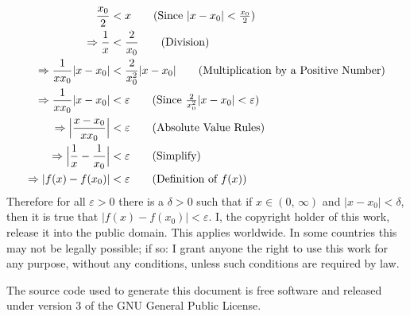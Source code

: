\documentclass{article}
\theoremstyle{normal}
\begin{document}
    \begin{align}
        \frac{x_{0}}{2}&<x
            \tag{Since $|x-x_{0}|<\frac{x_{0}}{2}$}\\
        \Rightarrow
            \frac{1}{x}&<\frac{2}{x_{0}}
                \tag{Division}\\
        \Rightarrow
            \frac{1}{xx_{0}}|x-x_{0}|&<\frac{2}{x_{0}^{2}}|x-x_{0}|
                \tag{Multiplication by a Positive Number}\\
        \Rightarrow
            \frac{1}{xx_{0}}|x-x_{0}|&<\varepsilon
                \tag{Since $\frac{2}{x_{0}^{2}}|x-x_{0}|<\varepsilon$}\\
        \Rightarrow
            \Big|\frac{x-x_{0}}{xx_{0}}\Big|&<\varepsilon
                \tag{Absolute Value Rules}\\
        \Rightarrow
            \Big|\frac{1}{x}-\frac{1}{x_{0}}\Big|&<\varepsilon
                \tag{Simplify}\\
        \Rightarrow
            |f(x)-f(x_{0})|&<\varepsilon
                \tag{Definition of $f(x)$}
    \end{align}
    Therefore for all $\varepsilon>0$ there is a $\delta>0$ such that if
    $x\in(0,\,\infty)$ and $|x-x_{0}|<\delta$, then it is true that
    $|f(x)-f(x_{0})|<\varepsilon$.
    \newpage
    I, the copyright holder of this work, release it into the public domain.
    This applies worldwide. In some countries this may not be legally possible;
    if so: I grant anyone the right to use this work for any purpose, without
    any conditions, unless such conditions are required by law.
    \par\hfill\par
    The source code used to generate this document is free software and released
    under version 3 of the GNU General Public License.
\end{document}
